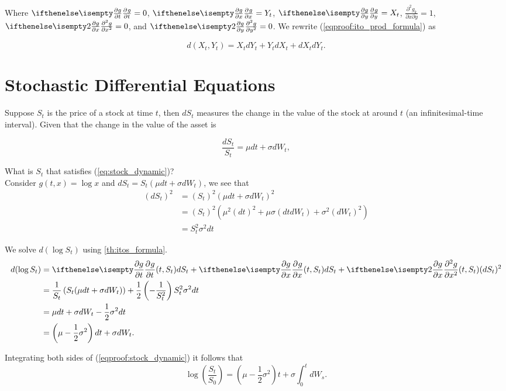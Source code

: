 \documentclass[../TGMAFFIRO.tex]{subfiles}
\begin{document}
Where $\partialwrt{g}{t} = 0$, $\partialwrt{g}{x} = Y_t$, $\partialwrt{g}{y} = X_t$, $\frac{\partial^2g_k}{\partial x\partial y} = 1$, $\partialwrt[2]{g}{x} = 0$, and $\partialwrt[2]{g}{y} = 0$. We rewrite (\ref{eqproof:ito_prod_formula}) as

\begin{equation}
  d(X_t, Y_t) = X_t dY_t + Y_t dX_t + dX_t dY_t. \label{eq:ito_rule_product}
\end{equation}

\section{Stochastic Differential Equations}
Suppose $S_t$ is the price of a stock at time $t$, then $dS_t$ measures the change in the value of the stock at around $t$ (an infinitesimal-time interval). Given that the change in the value of the asset is

\begin{equation}
	\frac{dS_t}{S_t} = \mu dt + \sigma dW_t, \label{eq:stock_dynamic}
\end{equation}

What is $S_t$ that satisfies (\ref{eq:stock_dynamic})?\\

Consider $g(t, x)= \log x$ and $dS_t = S_t(\mu dt + \sigma dW_t)$, we see that
\begin{align}
	\left(dS_t\right)^2 &= (S_t)^2(\mu dt + \sigma dW_t)^2\\
		&= (S_t)^2(\mu^2 \left(dt\right)^2 + \mu\sigma (dtdW_t) + \sigma^2 (dW_t)^2)\\
		&= S_t^2\sigma^2 dt
\end{align}

We solve $d(\log S_t)$ using \ref{th:itos_formula}.
\begin{align}
	d(\log S_t) &= \partialwrt{g}{t}{(t, S_t)} dS_t + \partialwrt{g}{x}{(t, S_t)} dS_t + \partialwrt[2]{g}{x}{(t, S_t)} (dS_t)^2 \nonumber \\
&= \frac{1}{S_t}\left(S_t(\mu dt + \sigma dW_t)\right) + \frac{1}{2}\left(-\frac{1}{S_t^2} \right)S_t^2\sigma^2 dt \nonumber \\
&= \mu dt + \sigma dW_t - \frac{1}{2}\sigma^2 dt \nonumber \\
&= \left(\mu - \frac{1}{2}\sigma^2\right)dt + \sigma dW_t. \label{eqproof:stock_dynamic}
\end{align}

Integrating both sides of (\ref{eqproof:stock_dynamic}) it follows that
\begin{equation}
	\log\left(\frac{S_t}{S_0}\right) = \left(\mu - \frac{1}{2}\sigma^2\right) t + \sigma\int_0^t dW_s.
\end{equation}
\end{document}
